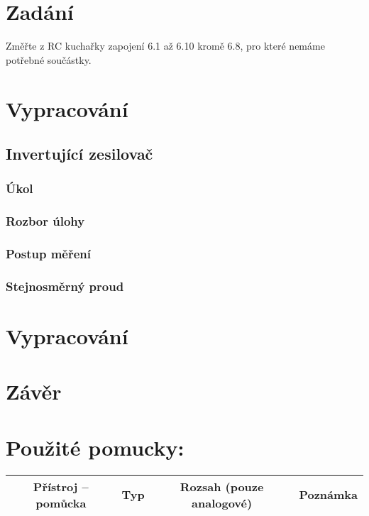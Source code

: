 \documentclass[a4paper]{article}
\begin{document}



\section*{Zadání}
Změřte z RC kuchařky zapojení 6.1 až 6.10 kromě 6.8, pro které nemáme potřebné součástky.
\section*{Vypracování}
\subsection*{Invertující zesilovač}
\subsubsection*{Úkol}
\subsubsection*{Rozbor úlohy}
\subsubsection*{Postup měření}
\subsubsection*{Stejnosměrný proud}


\section*{Vypracování}

\section*{Závěr}
\section*{Použité pomucky:}
\begin{tabularx}{\linewidth}{c|c|c|c}
	Přístroj – pomůcka & Typ & Rozsah (pouze analogové)
	& Poznámka \\
	\hline
\end{tabularx}
\end{document}
